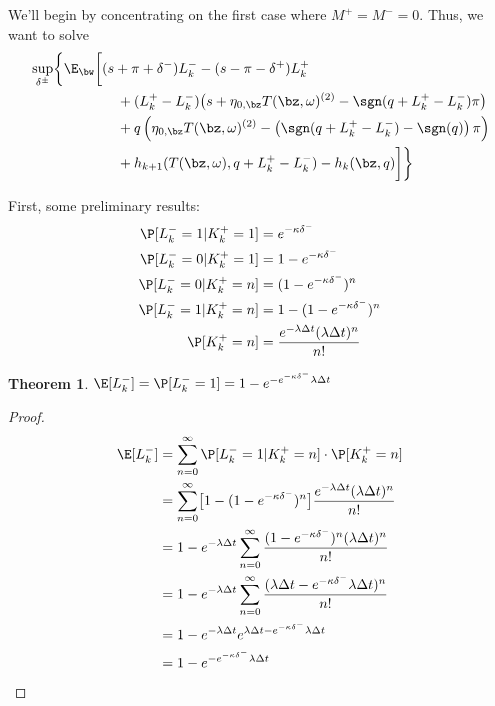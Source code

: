 \documentclass[12pt]{article}
\newtheorem{theorem}{Theorem}
\begin{document}
We'll begin by concentrating on the first case where $M^+ = M^- = 0$. Thus, we want to solve
\begin{equation}
\label{eq:discretesup1}
\begin{split}
& \sup_{\delta^\pm} \biggl\lbrace \E_{\bw} \biggl[
(s + \pi + \delta^-)L_k^- - (s - \pi - \delta^+)L_k^+ \\
& \hphantom{\sup_{\bu} \biggl\lbrace \E_{\bw} \biggl[ {}+{}} + (L_k^+ - L_k^-) \bigl( s + \eta_{0,\bz} T(\bz, \omega)^{(2)}  -\sgn( q + L_k^+ - L_k^-)\pi   \bigr) \\
& \hphantom{\sup_{\bu} \biggl\lbrace \E_{\bw} \biggl[ {}+{}} + q\left( \eta_{0,\bz} T(\bz, \omega)^{(2)}  -\left( \sgn( q + L_k^+ - L_k^-) - \sgn(q) \right) \pi \right) \\
& \hphantom{\sup_{\bu} \biggl\lbrace \E_{\bw} \biggl[ {}+{}} + h_{k+1}(T(\bz,\omega), q + L_k^+ - L_k^- ) -  h_k(\bz,q) \biggr] \biggr\rbrace
\end{split}
\end{equation}

First, some preliminary results:
\begin{align*}
\P [ L_k^- = 1 | K_k^+ = 1] & = e^{-\kappa \delta^-} \\
\P [ L_k^- = 0 | K_k^+ = 1] & = 1 - e^{-\kappa \delta^-} \\
\P [ L_k^- = 0 | K_k^+ = n] & = (1 - e^{-\kappa \delta^-})^n \\
\P [ L_k^- = 1 | K_k^+ = n] & = 1 - (1 - e^{-\kappa \delta^-})^n \\
\P [ K_k^+ = n] & = \frac{e^{-\lambda \Delta t} (\lambda \Delta t)^n}{n!} \\
\end{align*}

\begin{theorem}
$\E [ L_k^- ] = \P [ L_k^- = 1] =  1 - e^{-e^{-\kappa \delta^-} \lambda \Delta t}$
\end{theorem}
\begin{proof}
\begin{align*}
\E [ L_k^- ] & = \sum_{n=0}^\infty \P [ L_k^- = 1 | K_k^+ = n] \cdot \P[K_k^+ = n] \\
& =  \sum_{n=0}^\infty \bigl[ 1 - (1 - e^{-\kappa \delta^-})^n \bigr] \frac{e^{-\lambda \Delta t} (\lambda \Delta t)^n}{n!} \\
& = 1 - e^{-\lambda \Delta t} \sum_{n=0}^\infty \frac{(1 - e^{-\kappa \delta^-})^n (\lambda \Delta t)^n}{n!} \\
& = 1 - e^{-\lambda \Delta t} \sum_{n=0}^\infty \frac{(\lambda \Delta t - e^{-\kappa \delta^-}\lambda \Delta t)^n}{n!} \\
& = 1 - e^{-\lambda \Delta t} e^{\lambda \Delta t - e^{-\kappa \delta^-} \lambda \Delta t} \\
& = 1 - e^{- e^{-\kappa \delta^-} \lambda \Delta t}
\end{align*}
\end{proof}
\end{document}
